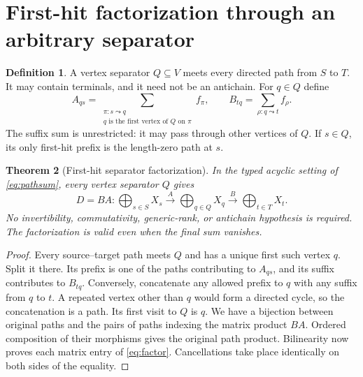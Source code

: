 \documentclass[11pt,letterpaper]{article}
\newtheorem{theorem}{Theorem}[section]
\theoremstyle{definition}\newtheorem{definition}[theorem]{Definition}
\theoremstyle{remark}\newtheorem{remark}[theorem]{Remark}
\begin{document}
\section{First-hit factorization through an arbitrary separator}
\begin{definition}
A vertex separator $Q\subseteq V$ meets every directed path from $S$ to $T$.
It may contain terminals, and it need not be an antichain. For $q\in Q$ define
\[
 A_{qs}=\sum_{\substack{\pi:s\leadsto q\\
                  q\text{ is the first vertex of }Q\text{ on }\pi}}f_\pi,
 \qquad
 B_{tq}=\sum_{\rho:q\leadsto t} f_\rho.
\]
The suffix sum is unrestricted: it may pass through other vertices of $Q$.
If $s\in Q$, its only first-hit prefix is the length-zero path at $s$.
\end{definition}

\begin{theorem}[First-hit separator factorization]\label{thm:firsthit}
In the typed acyclic setting of \eqref{eq:pathsum}, every vertex separator
$Q$ gives
\begin{equation}
D=BA:\bigoplus_{s\in S}X_s\xrightarrow{A}
       \bigoplus_{q\in Q}X_q\xrightarrow{B}
       \bigoplus_{t\in T}X_t.
\label{eq:factor}
\end{equation}
No invertibility, commutativity, generic-rank, or antichain hypothesis is
required. The factorization is valid even when the final sum vanishes.
\end{theorem}
\begin{proof}
Every source--target path meets $Q$ and has a unique first such vertex $q$.
Split it there. Its prefix is one of the paths contributing to $A_{qs}$,
and its suffix contributes to $B_{tq}$. Conversely, concatenate any allowed
prefix to $q$ with any suffix from $q$ to $t$. A repeated vertex other than
$q$ would form a directed cycle, so the concatenation is a path. Its first
visit to $Q$ is $q$. We have a bijection between original paths and the pairs
of paths indexing the matrix product $BA$. Ordered composition of their
morphisms gives the original path product. Bilinearity now proves each
matrix entry of \eqref{eq:factor}. Cancellations take place identically on
both sides of the equality.
\end{proof}
\end{document}
